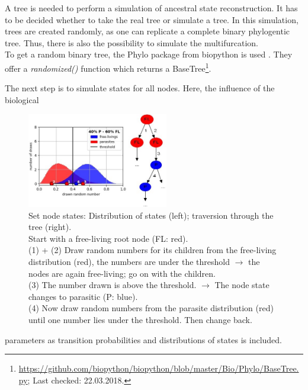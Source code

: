     A tree is needed to perform a simulation of ancestral state reconstruction. It has to be decided 
      whether to take the real tree or simulate a tree. In this simulation, trees are created randomly, 
      as one can replicate a complete binary phylogentic tree. Thus, there is also the possibility to 
      simulate the multifurcation. \\
    To get a random binary tree, the Phylo package from biopython is used \cite{Cock2009}. They offer 
      a \textit{randomized()} function which returns a BaseTree\footnote{
        \hyperlink{https://github.com/biopython/biopython/blob/master/Bio/Phylo/BaseTree.py}
        {https://github.com/biopython/biopython/blob/master/Bio/Phylo/BaseTree.py};
        Last checked: 22.03.2018.}.

    The next step is to simulate states for all nodes. Here, the influence of the biological  
      \begin{figure}
        \centering
        \includegraphics[width=0.55\textwidth]{Figures/40-60_all.jpg}
        \caption{Set node states: Distribution of states (left); traversion through the tree (right). \\
          Start with a free-living root node (FL: red). \\
          (1) + (2) Draw random numbers for its children from the free-living distribution (red), the 
            numbers are under the threshold $\rightarrow$ the nodes are again free-living; go on with 
            the children. \\
          (3) The number drawn is above the threshold. $\rightarrow$ The node state changes to 
            parasitic (P: blue). \\
          (4) Now draw random numbers from the parasite distribution (red) until one number lies under 
            the threshold. Then change back.}
        \label{fig:set node states}
      \end{figure} 
      parameters as transition probabilities and distributions of states is included.
      
